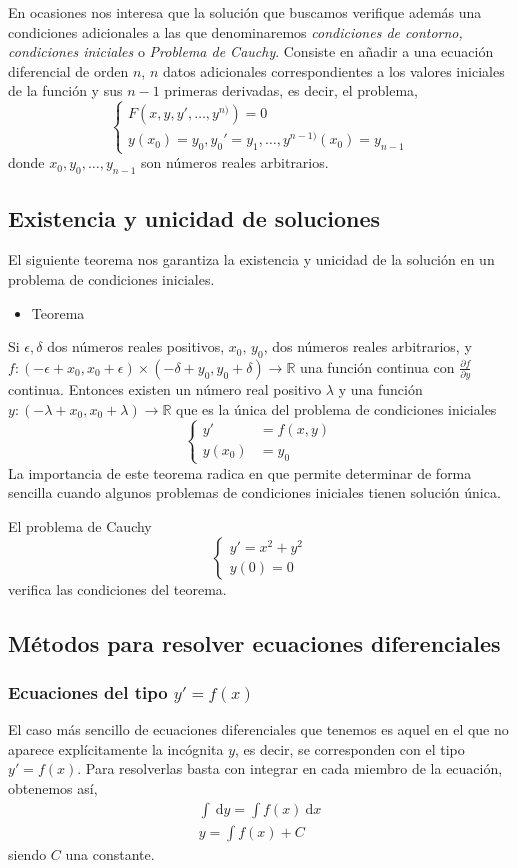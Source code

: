 En ocasiones nos interesa que la solución que buscamos verifique además una condiciones adicionales a las que denominaremos \textit{condiciones de contorno, condiciones iniciales} o \textit{Problema de Cauchy}. Consiste en añadir a una ecuación diferencial de orden $n$, $n$ datos adicionales correspondientes a los valores iniciales de la función y sus $n-1$ primeras derivadas, es decir, el problema,
$$
\begin{cases}
F(x,y,y',\dots,y^{n)})=0 \\
y(x_{0})=y_{0},y_{0}'=y_{1},\dots,y^{n-1)}(x_{0})=y_{n-1}
\end{cases}
$$
donde $x_{0},y_{0},\dots,y_{n-1}$ son números reales arbitrarios.
\subsection{Existencia y unicidad de soluciones}
El siguiente teorema nos garantiza la existencia y unicidad de la solución en un problema de condiciones iniciales.
\begin{itemize}[label=\color{red}\textbullet, leftmargin=*]
	\item \color{lightblue}Teorema
\end{itemize}
Si $\epsilon,\delta$ dos números reales positivos, $x_{0},\,y_{0}$, dos números reales arbitrarios, y $f:(-\epsilon+x_{0},x_{0}+\epsilon)\times(-\delta+y_{0},y_{0}+\delta)\to \mathbb{R}$ una función continua con $\frac{\partial f}{\partial y}$ continua. Entonces existen un número real positivo $\lambda$ y una función $y:(-\lambda+x_{0},x_{0}+\lambda)\to \mathbb{R}$ que es la única del problema de condiciones iniciales 
$$
\begin{cases}
y' & =f(x,y) \\
y(x_{0}) & =y_{0}
\end{cases}
$$
La importancia de este teorema radica en que permite determinar de forma sencilla cuando algunos problemas de condiciones iniciales tienen solución única.


El problema de Cauchy
$$
\begin{cases}
y'=x^{2}+y^{2}\\
y(0)=0
\end{cases}
$$
verifica las condiciones del teorema.
\subsection{Métodos para resolver ecuaciones diferenciales}
\subsubsection{Ecuaciones del tipo $y'=f(x)$}
El caso más sencillo de ecuaciones diferenciales que tenemos es aquel en el que no aparece explícitamente la incógnita $y$, es decir, se corresponden con el tipo $y'=f(x)$. Para resolverlas basta con integrar en cada miembro de la ecuación, obtenemos así,
$$
\begin{array}{l}
\int \:\mathrm{d}y=\int f(x)\:\mathrm{d}x \\
y=\int f(x)+C
\end{array}
$$
siendo $C$ una constante.

